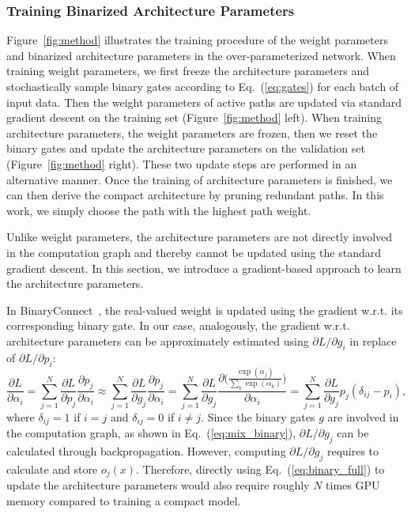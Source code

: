 \documentclass{article} \usepackage{iclr2019_conference,times}
\begin{document}
\subsubsection{Training Binarized Architecture Parameters}
\label{sec:grad_algo}
Figure~\ref{fig:method} illustrates the training procedure of the weight parameters and binarized architecture parameters in the over-parameterized network. When training weight parameters, we first freeze the architecture parameters and stochastically sample binary gates according to Eq.~(\ref{eq:gates}) for each batch of input data. Then the weight parameters of active paths are updated via standard gradient descent on the training set (Figure~\ref{fig:method} left). When training architecture parameters, the weight parameters are frozen, then we reset the binary gates and update the architecture parameters on the validation set (Figure~\ref{fig:method} right). These two update steps are performed in an alternative manner. Once the training of architecture parameters is finished, we can then derive the compact architecture by pruning redundant paths. In this work, we simply choose the path with the highest path weight.

Unlike weight parameters, the architecture parameters are not directly involved in the computation graph and thereby cannot be updated using the standard gradient descent. In this section, we introduce a gradient-based approach to learn the architecture parameters.

In BinaryConnect~\citep{courbariaux2015binaryconnect}, the real-valued weight is updated using the gradient w.r.t. its corresponding binary gate. In our case, analogously, the gradient w.r.t. architecture parameters can be approximately estimated using $\partial L / \partial g_i$ in replace of $\partial L / \partial p_i$:
\begin{equation}
\label{eq:binary_full}
    \frac{\partial L}{\partial \alpha_i} = \sum_{j = 1}^{N} \frac{\partial L}{\partial p_j} \frac{\partial p_j}{\partial \alpha_i} \approx 
    \sum_{j = 1}^{N} \frac{\partial L}{\partial g_j} \frac{\partial p_j}{\partial \alpha_i} = \sum_{j = 1}^{N} \frac{\partial L}{\partial g_j} \frac{\partial \Big(\frac{\exp(\alpha_j)}{\sum_{k} \exp(\alpha_k)} \Big) }{\partial \alpha_i} = 
    \sum_{j = 1}^{N} \frac{\partial L}{\partial g_j} p_j (\delta_{ij} - p_i),
\end{equation}
where $\delta_{ij} = 1$ if $i = j$ and $\delta_{ij} = 0$ if $i \neq j$. Since the binary gates $g$ are involved in the computation graph, as shown in Eq.~(\ref{eq:mix_binary}), $\partial L / \partial g_j$ can be calculated through backpropagation. However, computing $\partial L / \partial g_j$  requires to calculate and store $o_j(x)$. Therefore, directly using Eq.~(\ref{eq:binary_full}) to update the architecture parameters would also require roughly $N$ times GPU memory compared to training a compact model.
\end{document}
